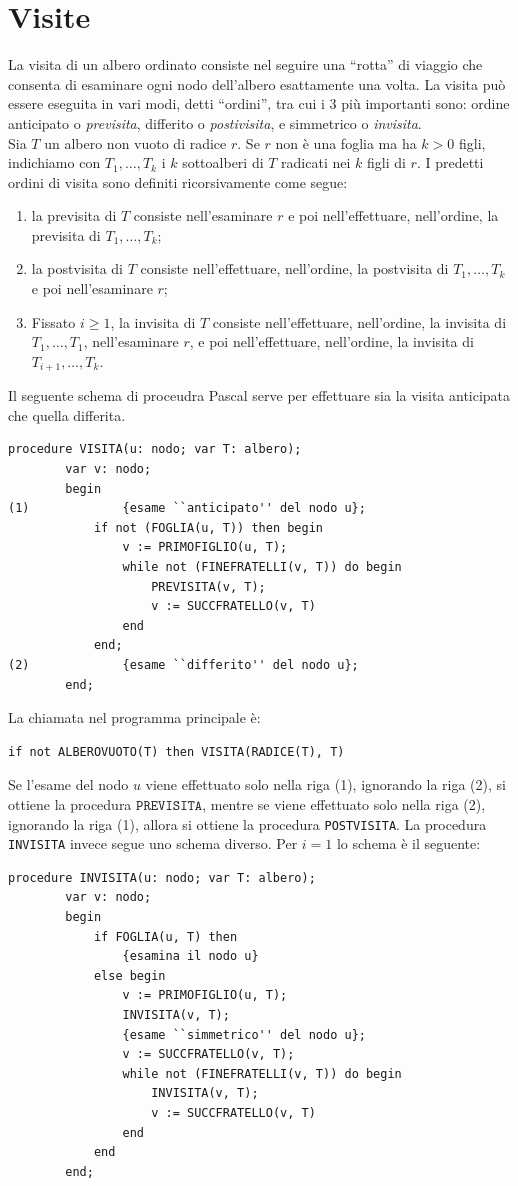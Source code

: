 \documentclass[12pt]{report}
\begin{document}
  \section{Visite}
  La visita di un albero ordinato consiste nel seguire una ``rotta'' di viaggio che consenta di esaminare ogni nodo dell'albero esattamente una volta. La visita può essere eseguita in vari modi, detti ``ordini'', tra cui i 3 più importanti sono: ordine anticipato o \textit{previsita}, differito o \textit{postivisita}, e simmetrico o \textit{invisita}. \\
  Sia $T$ un albero non vuoto di radice $r$. Se $r$ non è una foglia ma ha $k > 0$  figli, indichiamo con $T_1, \dots, T_k$ i $k$ sottoalberi di $T$ radicati nei $k$ figli di $r$. I predetti ordini di visita sono definiti ricorsivamente come segue:
  \begin{enumerate}
  	\item la previsita di $T$ consiste nell'esaminare $r$ e poi nell'effettuare, nell'ordine, la previsita di $T_1, \dots, T_k$;
  	\item la postvisita di $T$ consiste nell'effettuare, nell'ordine, la postvisita di $T_1, \dots, T_k$ e poi nell'esaminare $r$;
  	\item Fissato $i \geq 1$, la invisita di $T$ consiste nell'effettuare, nell'ordine, la invisita di $T_1, \dots, T_1$, nell'esaminare $r$, e poi nell'effettuare, nell'ordine, la invisita di $T_{i+1}, \dots, T_k$.
  \end{enumerate}
  Il seguente schema di proceudra Pascal serve per effettuare sia la visita anticipata che quella differita.
  \begin{lstlisting}[style=pascalstyle]
  	procedure VISITA(u: nodo; var T: albero);
  		var v: nodo;
  		begin
(1) 			{esame ``anticipato'' del nodo u};
  			if not (FOGLIA(u, T)) then begin
  				v := PRIMOFIGLIO(u, T);
  				while not (FINEFRATELLI(v, T)) do begin
  					PREVISITA(v, T);
  					v := SUCCFRATELLO(v, T)
  				end
  			end;
(2)  			{esame ``differito'' del nodo u};
  		end;
  \end{lstlisting}
  La chiamata nel programma principale è:
  \begin{lstlisting}[style=pascalstyle]
  	if not ALBEROVUOTO(T) then VISITA(RADICE(T), T)
  \end{lstlisting}
  Se l'esame del nodo $u$ viene effettuato solo nella riga (1), ignorando la riga (2), si ottiene la procedura $\texttt{PREVISITA}$, mentre se viene effettuato solo nella riga (2), ignorando la riga (1), allora si ottiene la procedura \texttt{POSTVISITA}. La procedura \texttt{INVISITA} invece segue uno schema diverso. Per $i=1$ lo schema è il seguente:
  \begin{lstlisting}[style=pascalstyle]
  	procedure INVISITA(u: nodo; var T: albero);
  		var v: nodo;
  		begin
  			if FOGLIA(u, T) then
  				{esamina il nodo u}
  			else begin
  				v := PRIMOFIGLIO(u, T);
  				INVISITA(v, T);
  				{esame ``simmetrico'' del nodo u};
  				v := SUCCFRATELLO(v, T);
  				while not (FINEFRATELLI(v, T)) do begin
  					INVISITA(v, T);
  					v := SUCCFRATELLO(v, T)
  				end
  			end
  		end;
  \end{lstlisting}
\end{document}
